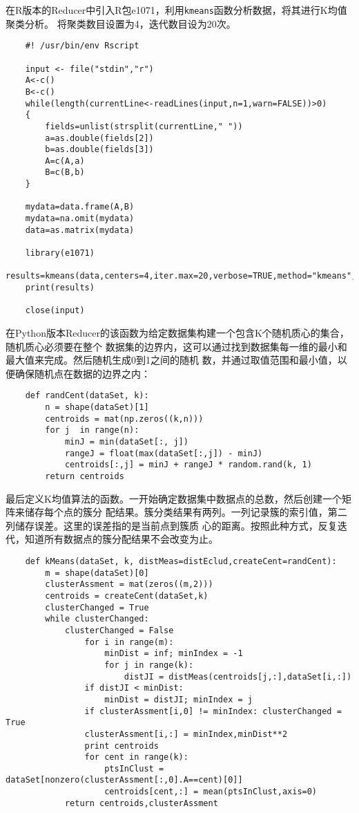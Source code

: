 在R版本的Reducer中引入R包e1071，利用\lstinline|kmeans|函数分析数据，将其进行K均值聚类分析。
将聚类数目设置为4，迭代数目设为20次。

\begin{lstlisting}
	#! /usr/bin/env Rscript

	input <- file("stdin","r")
	A<-c()
	B<-c()
	while(length(currentLine<-readLines(input,n=1,warn=FALSE))>0)
	{
	    fields=unlist(strsplit(currentLine," "))
	    a=as.double(fields[2])
	    b=as.double(fields[3])
	    A=c(A,a)
	    B=c(B,b)
	}

	mydata=data.frame(A,B)
	mydata=na.omit(mydata)
	data=as.matrix(mydata)

	library(e1071)
	results=kmeans(data,centers=4,iter.max=20,verbose=TRUE,method="kmeans",m=2)
	print(results)

	close(input)
\end{lstlisting}

在Python版本Reducer的该函数为给定数据集构建一个包含K个随机质心的集合，随机质心必须要在整个
数据集的边界内，这可以通过找到数据集每一维的最小和最大值来完成。然后随机生成0到1之间的随机
数，并通过取值范围和最小值，以便确保随机点在数据的边界之内：

\begin{lstlisting}
	def randCent(dataSet, k):
	    n = shape(dataSet)[1]
	    centroids = mat(np.zeros((k,n)))
	    for j  in range(n):
	        minJ = min(dataSet[:, j])
	        rangeJ = float(max(dataSet[:,j]) - minJ)
	        centroids[:,j] = minJ + rangeJ * random.rand(k, 1)
	    return centroids
\end{lstlisting}

最后定义K均值算法的函数。一开始确定数据集中数据点的总数，然后创建一个矩阵来储存每个点的簇分
配结果。簇分类结果有两列。一列记录簇的索引值，第二列储存误差。这里的误差指的是当前点到簇质
心的距离。按照此种方式，反复迭代，知道所有数据点的簇分配结果不会改变为止。

\begin{lstlisting}
	def kMeans(dataSet, k, distMeas=distEclud,createCent=randCent):
	    m = shape(dataSet)[0]
	    clusterAssment = mat(zeros((m,2)))
	    centroids = createCent(dataSet,k)
	    clusterChanged = True
	    while clusterChanged:
	        clusterChanged = False
	            for i in range(m):
	                minDist = inf; minIndex = -1
	                for j in range(k):
	                    distJI = distMeas(centroids[j,:],dataSet[i,:])
	            if distJI < minDist:
	                minDist = distJI; minIndex = j
	            if clusterAssment[i,0] != minIndex: clusterChanged = True
	            clusterAssment[i,:] = minIndex,minDist**2
	            print centroids
	            for cent in range(k):
	                ptsInClust = dataSet[nonzero(clusterAssment[:,0].A==cent)[0]]
	                centroids[cent,:] = mean(ptsInClust,axis=0)
	        return centroids,clusterAssment
\end{lstlisting}
